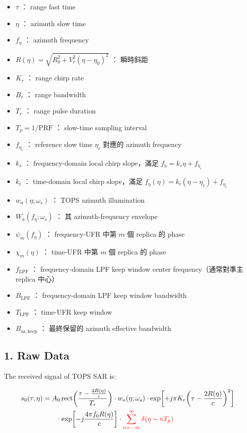 \documentclass[11pt]{article}
\providecommand{\tightlist}{%
  \setlength{\itemsep}{0pt}\setlength{\parskip}{0pt}}
\begin{document}
\begin{itemize}
\tightlist
\item
  \(\tau\) ： range fast time
\item
  \(\eta\) ： azimuth slow time
\item
  \(f_\eta\) ： azimuth frequency
\item
  \(R(\eta)=\sqrt{R_0^2+V_r^2(\eta-\eta_0)^2}\) ： 瞬時斜距
\item
  \(K_r\) ： range chirp rate
\item
  \(B_r\) ： range bandwidth
\item
  \(T_r\) ： range pulse duration
\item
  \(T_p=1/\mathrm{PRF}\) ： slow-time sampling interval
\item
  \(f_{\eta_c}\) ： reference slow time \(\eta_c\) 對應的 azimuth
  frequency
\item
  \(k_s\) ： frequency-domain local chirp slope，滿足
  \(f_\eta = k_s\eta + f_{\eta_c}\)
\item
  \(k_t\) ： time-domain local chirp slope，滿足
  \(f_\eta(\eta)=k_t(\eta-\eta_c)+f_{\eta_c}\)
\item
  \(w_a(\eta;\omega_s)\) ： TOPS azimuth illumination
\item
  \(W_a(f_\eta;\omega_s)\) ： 其 azimuth-frequency envelope
\item
  \(\psi_m(f_\eta)\) ： frequency-UFR 中第 \(m\) 個 replica 的 phase
\item
  \(\chi_m(\eta)\) ： time-UFR 中第 \(m\) 個 replica 的 phase
\item
  \(f_{\mathrm{LPF}}\) ： frequency-domain LPF keep window center
  frequency（通常對準主 replica 中心）
\item
  \(B_{\mathrm{LPF}}\) ： frequency-domain LPF keep window bandwidth
\item
  \(T_{\mathrm{LPF}}\) ： time-UFR keep window
\item
  \(B_{\mathrm{az,keep}}\) ： 最終保留的 azimuth effective bandwidth
\end{itemize}

\hypertarget{raw-data}{%
\subsection{1. Raw Data}\label{raw-data}}

The received signal of TOPS SAR is:

\begin{equation}
\begin{aligned}
s_0(\tau,\eta)
&=
A_0\,
\mathrm{rect}\biggl( \frac{\tau-\frac{2R(\eta)}{c}}{T_r} \biggr)
\cdot w_a(\eta;\omega_s)
\cdot \exp\biggl[ +j\pi K_r\biggl( \tau-\frac{2R(\eta)}{c} \biggr)^2 \biggr]\\
&\qquad \cdot \exp\biggl[ -j\frac{4\pi f_0R(\eta)}{c} \biggr]
\cdot {\color{red}{\sum_{n=-\infty}^{\infty}\delta(\eta-nT_p)}}
\end{aligned}
\end{equation}
\end{document}
